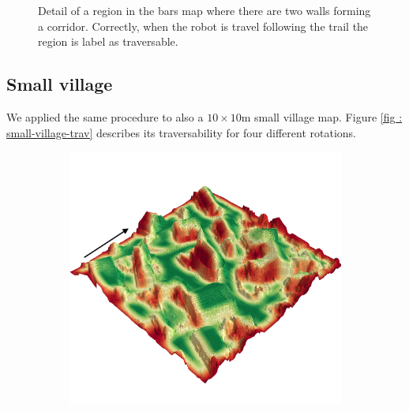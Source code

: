 \documentclass[../document.tex]{subfiles}
\begin{document}
\begin{figure} [htbp]
\begin{subfigure}[b]{0.23\textwidth}
  \end{subfigure}
  \caption{Detail of a region in the bars map where there are two walls forming a corridor. Correctly, when the robot is travel following the trail the region is label as traversable.}
  \label{fig : bars-tunnel-trav}
  \end{figure}

\subsection{Small village}
We applied the same procedure to also a $10\times10$m small village map. Figure \ref{fig : small-village-trav} describes its traversability for four different rotations.

\begin{figure} [htbp]
  \centering
  \begin{subfigure}[b]{0.45\textwidth}
    \includegraphics[width=\linewidth]{../img/4/traversability/sullens/-270.png} 
  \end{subfigure}
  \begin{subfigure}[b]{0.45\textwidth}

\end{subfigure}
\end{figure}
\end{document}
